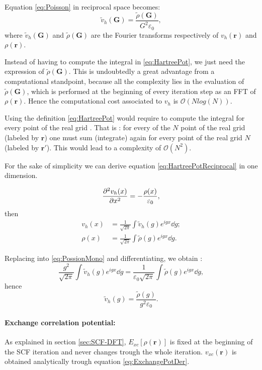 \documentclass[a4paper,12pt]{article}
\newcommand\mf[1]{\mathbf{#1}}
\newcommand\dens{\rho(\mathbf{r})}
\newcommand\erre{\mathbf{r}}
\newcommand\bigO{\mathcal{O}}
\begin{document}
Equation \eqref{eq:Poisson} in reciprocal space becomes:
\begin{equation}\label{eq:HartreePotReciprocal}
	\tilde{v}_{h}(\mf{G}) = \frac{\tilde{\rho}(\mf{G})}{G^2 \varepsilon_{0}},
\end{equation}
where $\tilde{v}_{h}(\mf{G})$ and $\tilde{\rho}(\mf{G})$ are the Fourier transforms respectively of $v_{h}(\erre)$ and $\dens$.

Instead of having to compute the integral in \eqref{eq:HartreePot}, we just need the expression of $\tilde{\rho}(\mf{G})$.
This is undoubtedly a great advantage from a computational standpoint, because all the complexity lies in the evaluation of $\tilde{\rho}(\mf{G})$, which is performed at the beginning of every iteration step as an FFT of $\dens$.
Hence the computational cost associated to $v_{h}$ is $\bigO(N log(N))$.

Using the definition \eqref{eq:HartreePot} would require to compute the integral for every point of the real grid . That is : for every of the $N$ point of the real grid (labeled by $\mf{r}$) one must sum (integrate) again for every point of the real grid $N$ (labeled by $\mf{r}'$). 
This would lead to a complexity of $\mathcal{O}(N^2)$.

For the sake of simplicity we can derive equation \eqref{eq:HartreePotReciprocal} in one dimension.

\begin{equation} \label{eq:PossionMono}
	\pdv[2]{v_{h}(x)}{x} = - \frac{\rho(x)}{\varepsilon_0},
\end{equation}
then 
\begin{align*}
	v_{h}(x) &= \frac{1}{\sqrt{2\pi}} \int \tilde{v}_{h}(g) e^{i g x} \dd{g}; \\
	\rho(x) &= \frac{1}{\sqrt{2\pi}} \int \tilde{\rho}(g) e^{i g x} \dd{g}.
\end{align*}

Replacing into  \eqref{eq:PossionMono} and differentiating, we obtain :
\begin{equation}
	\frac{g^2}{\sqrt{2\pi}} \int \tilde{v}_{h}(g) e^{i g x} \dd{g} = \frac{1}{\varepsilon_{0}\sqrt{2\pi}} \int \tilde{\rho}(g) e^{i g x} \dd{g},
\end{equation}
hence 
\begin{equation}
	\tilde{v}_{h}(g) = \frac{\tilde{\rho}(g)}{g^2 \varepsilon_{0}}.
\end{equation}



\paragraph{Exchange correlation potential:} 
As explained in section \ref{sec:SCF-DFT}, $E_{xc}[\dens]$ is fixed at the beginning of the SCF iteration and never changes trough the whole iteration. $v_{xc}(\erre)$ is obtained analytically trough equation \eqref{eq:ExchangePotDer}.
\end{document}
